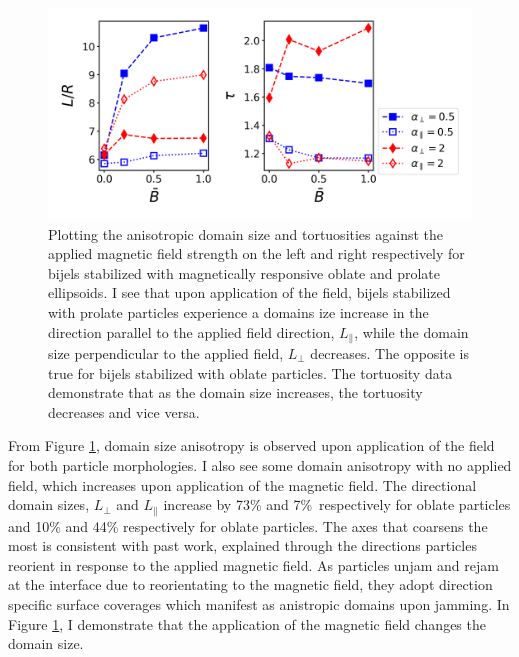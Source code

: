 \begin{figure} 
\centering 
\includegraphics[scale=0.5]{../figures/results/paper2/domain_size_aniso-field_on.png} 
\caption{Plotting the anisotropic domain size and tortuosities against the applied magnetic field strength on the left and right respectively for bijels 
         stabilized with magnetically responsive oblate and prolate ellipsoids. I see that upon application of the field, bijels stabilized with prolate 
         particles experience a domains ize increase in the direction parallel to the applied field direction, $L_{\parallel}$, while the domain size 
         perpendicular to the applied field, $L_{\perp}$ decreases. The opposite is true for bijels stabilized with oblate particles. The tortuosity data 
         demonstrate that as the domain size increases, the tortuosity decreases and vice versa.} 
\label{fig:domain_size_aniso-field_on} 
\end{figure}

From Figure \ref{fig:domain_size_aniso-field_on}, domain size anisotropy is observed upon application of the field for both
particle morphologies. I also see some domain anisotropy with no applied field, which increases upon application of the magnetic field.
The directional domain sizes, $L_{\perp}$ and $L_{\parallel}$ increase by 73\% and 7\%\ respectively for oblate particles and
10\% and 44\% respectively for oblate particles. The axes that coarsens the most is consistent with past work, explained through the
directions particles reorient in response to the applied magnetic field. As particles unjam and rejam at the interface due to reorientating 
to the magnetic field, they adopt direction specific surface coverages which manifest as anistropic domains upon jamming. In Figure 
\ref{fig:domain_size_aniso-field_on}, I demonstrate that the application of the magnetic field changes the domain size. 

